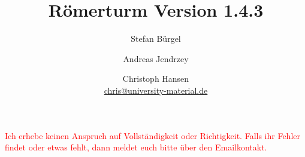 \documentclass[a5paper,9pt,fleqn,twoside]{scrartcl}
\title{Römerturm Version 1.4.3}
\author{Stefan Bürgel \and Andreas Jendrzey \and Christoph Hansen \\ 
\href{mailto:chris@university-material.de}{chris@university-material.de}}
\date{}
\begin{document}
\thispagestyle{empty}
\cleardoublepage
\maketitle


\textcolor{red}{Ich erhebe keinen Anspruch auf Vollständigkeit oder Richtigkeit. Falls ihr Fehler findet oder etwas fehlt, dann meldet euch bitte über den Emailkontakt.}

\setcounter{page}{1}
\begin{multicols}{2}
	\tableofcontents
\end{multicols}
	\pagebreak
	
	
	
	
	
	
	
	
\pagestyle{empty}
\clearpage
\section*{ }
\clearpage
\section*{ }
\end{document}
